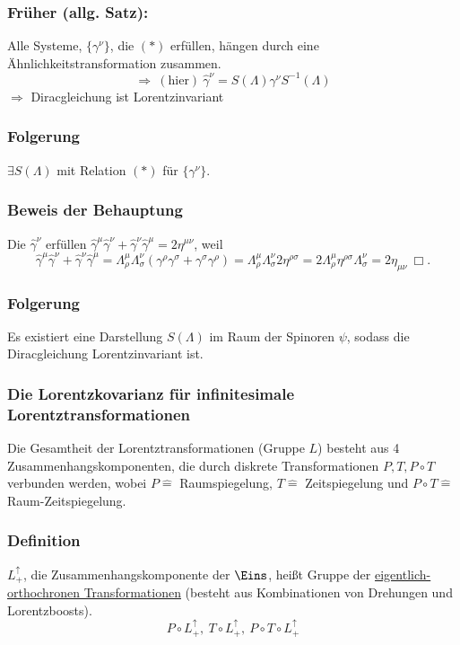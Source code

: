 \documentclass[twoside,a4paper]{scrartcl}
\renewcommand{\1}{\mathds{1}}
\newcommand{\Ra}{\Rightarrow}
\newcommand{\entspricht}{\mathrel{\widehat{=}}}
\renewcommand{\L}{\Lambda}
\begin{document}
\subsubsection*{Früher (allg. Satz):}
Alle Systeme, $\{\gamma^\nu\}$, die $(*)$ erfüllen, hängen durch eine Ähnlichkeitstransformation zusammen.\\
$$\Ra \ \mathrm{(hier)} \ \hat \gamma^\nu=S(\L) \gamma^\nu S^{-1}(\L)$$
$\Ra$ Diracgleichung ist Lorentzinvariant
\subsubsection*{Folgerung}
$\exists S(\L)$ mit Relation $(*)$ für $\{\gamma^\nu\}$.
\subsubsection*{Beweis der Behauptung}
Die $\hat \gamma^\nu$ erfüllen $\hat \gamma^\mu \hat \gamma^\nu+\hat \gamma^\nu \hat \gamma^\mu=2 \eta^{\mu\nu} $, weil 
$$\hat \gamma^\mu \hat \gamma^\nu+\hat \gamma^\nu \hat \gamma^\mu=\L^\mu_\rho \L_\sigma^\nu(\gamma^\rho\gamma^\sigma+\gamma^\sigma\gamma^\rho)=\L_\rho^\mu \L^\nu_\sigma 2 \eta^{\rho\sigma}=2\L_\rho^\mu \eta^{\rho\sigma}\L^\nu_\sigma =2\eta_{\mu\nu} \ \Box.$$
\subsubsection*{Folgerung}
Es existiert eine Darstellung $S(\L)$ im Raum der Spinoren $\psi$, sodass die Diracgleichung Lorentzinvariant ist.

\subsubsection{Die Lorentzkovarianz für infinitesimale Lorentztransformationen}
Die Gesamtheit der Lorentztransformationen (Gruppe $L$) besteht aus 4 Zusammenhangskomponenten, die durch diskrete Transformationen $P,T,P\circ T$ verbunden werden, wobei $P\entspricht$ Raumspiegelung, $T\entspricht$ Zeitspiegelung und $P\circ T\entspricht$ Raum-Zeitspiegelung.
\subsubsection*{Definition}
 $L_+^\uparrow$, die Zusammenhangskomponente der $\Eins$, heißt Gruppe der \underline{eigentlich-orthochronen Transformationen} (besteht aus Kombinationen von Drehungen und Lorentzboosts).
$$P\circ L_+^\uparrow, \ T \circ L_+^\uparrow, \ P \circ T \circ L_+^\uparrow$$
\end{document}
